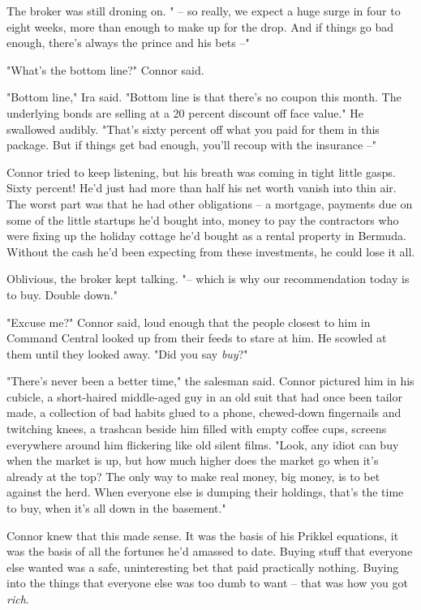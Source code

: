 The broker was still droning on. " -- so really, we expect a huge
surge in four to eight weeks, more than enough to make up for the
drop. And if things go bad enough, there's always the prince and
his bets --"

"What's the bottom line?" Connor said.

"Bottom line," Ira said. "Bottom line is that there's no coupon
this month. The underlying bonds are selling at a 20 percent
discount off face value." He swallowed audibly. "That's sixty
percent off what you paid for them in this package. But if things
get bad enough, you'll recoup with the insurance --"

Connor tried to keep listening, but his breath was coming in tight
little gasps. Sixty percent! He'd just had more than half his net
worth vanish into thin air. The worst part was that he had other
obligations -- a mortgage, payments due on some of the little
startups he'd bought into, money to pay the contractors who were
fixing up the holiday cottage he'd bought as a rental property in
Bermuda. Without the cash he'd been expecting from these
investments, he could lose it all.

Oblivious, the broker kept talking. "-- which is why our
recommendation today is to buy. Double down."

"Excuse me?" Connor said, loud enough that the people closest to
him in Command Central looked up from their feeds to stare at him.
He scowled at them until they looked away. "Did you say
\emph{buy}?"

"There's never been a better time," the salesman said. Connor
pictured him in his cubicle, a short-haired middle-aged guy in an
old suit that had once been tailor made, a collection of bad habits
glued to a phone, chewed-down fingernails and twitching knees, a
trashcan beside him filled with empty coffee cups, screens
everywhere around him flickering like old silent films. "Look, any
idiot can buy when the market is up, but how much higher does the
market go when it's already at the top? The only way to make real
money, big money, is to bet against the herd. When everyone else is
dumping their holdings, that's the time to buy, when it's all down
in the basement."

Connor knew that this made sense. It was the basis of his Prikkel
equations, it was the basis of all the fortunes he'd amassed to
date. Buying stuff that everyone else wanted was a safe,
uninteresting bet that paid practically nothing. Buying into the
things that everyone else was too dumb to want -- that was how you
got \emph{rich}.

